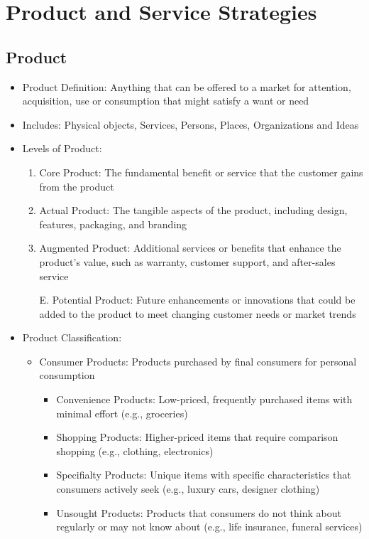 \documentclass[openany,12pt,a4paper]{book}
\begin{document}
\chapter{Product and Service Strategies}
\section{Product}
\begin{itemize}
    \item Product Definition: Anything that can be offered to a market for attention, acquisition, use or consumption that might satisfy a want or need
    \item Includes: Physical objects, Services, Persons, Places, Organizations and Ideas
    \item Levels of Product:
    \begin{enumerate}
        \item Core Product: The fundamental benefit or service that the customer gains from the product
        \item Actual Product: The tangible aspects of the product, including design, features, packaging, and branding
        \item Augmented Product: Additional services or benefits that enhance the product's value, such as warranty, customer support, and after-sales service
        \item[E.] Potential Product: Future enhancements or innovations that could be added to the product to meet changing customer needs or market trends
    \end{enumerate}
    \item Product Classification:
    \begin{itemize}
        \item Consumer Products: Products purchased by final consumers for personal consumption
        \begin{itemize}
            \item Convenience Products: Low-priced, frequently purchased items with minimal effort (e.g., groceries)
            \item Shopping Products: Higher-priced items that require comparison shopping (e.g., clothing, electronics)
            \item Specifialty Products: Unique items with specific characteristics that consumers actively seek (e.g., luxury cars, designer clothing)
            \item Unsought Products: Products that consumers do not think about regularly or may not know about (e.g., life insurance, funeral services)

\end{itemize}
\end{itemize}
\end{itemize}
\end{document}
